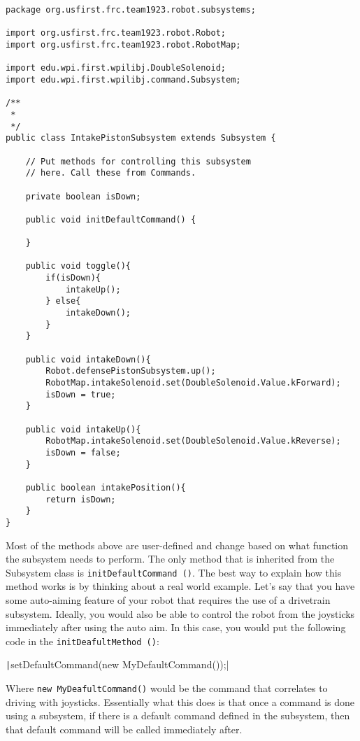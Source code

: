 \documentclass[11pt,fleqn]{article}
\newcommand{\mil}[2][java]{\texttt|#2|}
\begin{document}
\begin{verbatim}
package org.usfirst.frc.team1923.robot.subsystems;

import org.usfirst.frc.team1923.robot.Robot;
import org.usfirst.frc.team1923.robot.RobotMap;

import edu.wpi.first.wpilibj.DoubleSolenoid;
import edu.wpi.first.wpilibj.command.Subsystem;

/**
 *
 */
public class IntakePistonSubsystem extends Subsystem {

    // Put methods for controlling this subsystem
    // here. Call these from Commands.

    private boolean isDown;

    public void initDefaultCommand() {

    }

    public void toggle(){
        if(isDown){
            intakeUp();
        } else{
            intakeDown();
        }
    }

    public void intakeDown(){
        Robot.defensePistonSubsystem.up();
        RobotMap.intakeSolenoid.set(DoubleSolenoid.Value.kForward);
        isDown = true;
    }

    public void intakeUp(){
        RobotMap.intakeSolenoid.set(DoubleSolenoid.Value.kReverse);
        isDown = false;
    }

    public boolean intakePosition(){
        return isDown;
    }
}
\end{verbatim}

Most of the methods above are user-defined and change based on what function the subsystem needs to
perform. The only method that is inherited from the Subsystem class is \texttt{initDefaultCommand
()}. The best way to explain how this method works is by thinking about a real world example. Let's
say that you have some auto-aiming feature of your robot that requires the use of a drivetrain
subsystem. Ideally, you would also be able to control the robot from the joysticks immediately after
using the auto aim. In this case, you would put the following code in the \texttt{initDeafultMethod
()}:

\mil{setDefaultCommand(new MyDefaultCommand());}

Where \texttt{new MyDeafultCommand()} would be the command that correlates to driving with
joysticks. Essentially what this does is that once a command is done using a subsystem, if there is
a default command defined in the subsystem, then that default command will be called immediately
after.
\end{document}
